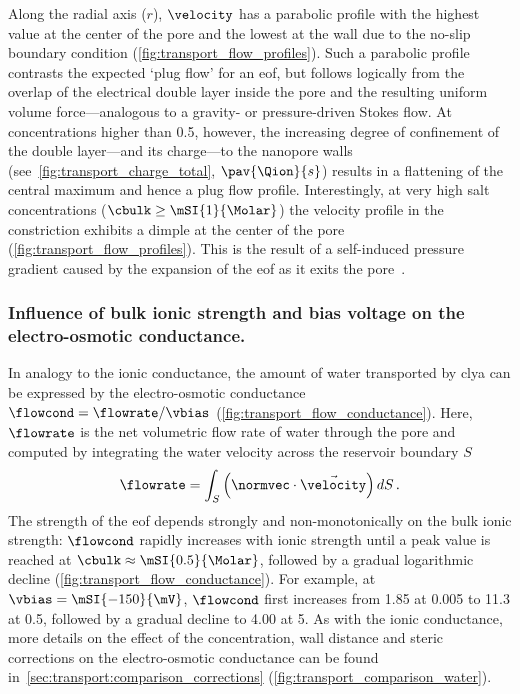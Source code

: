 Along the radial axis ($r$), $\velocity$ has a parabolic profile with the highest value at the center of the
pore and the lowest at the wall due to the no-slip boundary condition (\cref{fig:transport_flow_profiles}).
Such a parabolic profile contrasts the expected `plug flow' for an \gls{eof}, but follows logically from the
overlap of the electrical double layer inside the pore and the resulting uniform volume force---analogous to a
gravity- or pressure-driven Stokes flow. At concentrations higher than \SI{0.5}{\Molar}, however, the
increasing degree of confinement of the double layer---and its charge---to the nanopore walls
(see~\cref{fig:transport_charge_total}, $\pav{\Qion}{s}$) results in a flattening of the central maximum and
hence a plug flow profile. Interestingly, at very high salt concentrations ($\cbulk \ge \mSI{1}{\Molar}$) the
velocity profile in the constriction exhibits a dimple at the center of the pore
(\cref{fig:transport_flow_profiles}). This is the result of a self-induced pressure gradient caused by the
expansion of the \gls{eof} as it exits the pore~\cite{Melnikov-2017}.

\subsubsection{Influence of bulk ionic strength and bias voltage on the electro-osmotic conductance.}
%
In analogy to the ionic conductance, the amount of water transported by \gls{clya} can be expressed by the
electro-osmotic conductance $\flowcond = \flowrate / \vbias$ (\cref{fig:transport_flow_conductance}). Here,
$\flowrate$ is the net volumetric flow rate of water through the pore and computed by integrating the water
velocity across the reservoir boundary $S$
%
\begin{align}\label{eq:flowrate}
  \flowrate = \int_{S}\left(\normvec\cdot\vec{\velocity}\right)dS
  \text{\,.}
\end{align}
%
The strength of the \gls{eof} depends strongly and non-monotonically on the bulk ionic strength: $\flowcond$
rapidly increases with ionic strength until a peak value is reached at $\cbulk \approx \mSI{0.5}{\Molar}$,
followed by a gradual logarithmic decline (\cref{fig:transport_flow_conductance}). For example, at $\vbias =
\mSI{-150}{\mV}$, $\flowcond$ first increases from \SI{1.85}{\cnmpnspv} at \SI{0.005}{\Molar} to
\SI{11.3}{\cnmpnspv} at \SI{0.5}{\Molar}, followed by a gradual decline to \SI{4.00}{\cnmpnspv} at
\SI{5}{\Molar}. As with the ionic conductance, more details on the effect of the concentration, wall distance
and steric corrections on the electro-osmotic conductance can be found
in~\cref{sec:transport:comparison_corrections} (\cref{fig:transport_comparison_water}).

